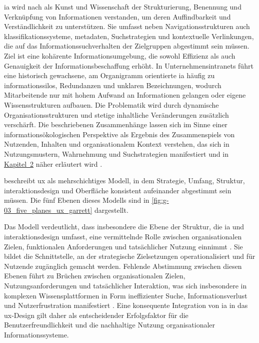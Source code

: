 \Gls{ia} wird nach \citeauthor{303:Rosenfeld2015} als Kunst und Wissenschaft der Strukturierung, Benennung und Verknüpfung von Informationen verstanden, um deren Auffindbarkeit und Verständlichkeit zu unterstützen. Sie umfasst neben Navigationsstrukturen auch \Gls{klassifikationssysteme}, \Gls{metadaten}, Suchstrategien und kontextuelle Verlinkungen, die auf das Informationssuchverhalten der Zielgruppen abgestimmt sein müssen. Ziel ist eine kohärente Informationsumgebung, die sowohl Effizienz als auch Genauigkeit der Informationsbeschaffung erhöht. In Unternehmensintranets führt eine historisch gewachsene, am Organigramm orientierte \Gls{ia} häufig zu \Gls{informationssilos}, Redundanzen und unklaren Bezeichnungen, wodurch Mitarbeitende nur mit hohem Aufwand an Informationen gelangen oder eigene Wissensstrukturen aufbauen. Die Problematik wird durch dynamische Organisationsstrukturen und stetige inhaltliche Veränderungen zusätzlich verschärft. Die beschriebenen Zusammenhänge lassen sich im Sinne einer informationsökologischen Perspektive als Ergebnis des Zusammenspiels von Nutzenden, Inhalten und organisationalem Kontext verstehen, das sich in Nutzungsmustern, Wahrnehmung und Suchstrategien manifestiert und in \hyperref[ch:02_theoretical-foundations]{Kapitel~2} näher erläutert wird \cite{303:Rosenfeld2015}.

\citeauthor{401:Garrett2011} beschreibt \Gls{ux} als mehrschichtiges Modell, in dem Strategie, Umfang, Struktur, \Gls{interaktionsdesign} und Oberfläche konsistent aufeinander abgestimmt sein müssen. Die fünf Ebenen dieses Modells sind in \autoref{fig:g-03_five_planes_ux_garrett} dargestellt.


Das Modell verdeutlicht, dass insbesondere die Ebene der Struktur, die \Gls{ia} und \Gls{interaktionsdesign} umfasst, eine vermittelnde Rolle zwischen organisationalen Zielen, funktionalen Anforderungen und tatsächlicher Nutzung einnimmt \cite{401:Garrett2011}. Sie bildet die Schnittstelle, an der strategische Zielsetzungen operationalisiert und für Nutzende zugänglich gemacht werden. Fehlende Abstimmung zwischen diesen Ebenen führt zu Brüchen zwischen organisationalen Zielen, Nutzungsanforderungen und tatsächlicher Interaktion, was sich insbesondere in komplexen Wissensplattformen in Form ineffizienter Suche, Informationsverlust und Nutzerfrustration manifestiert \cite{401:Garrett2011,303:Rosenfeld2015}. Eine konsequente Integration von \Gls{ia} in das \Gls{ux}-Design gilt daher als entscheidender Erfolgsfaktor für die Benutzerfreundlichkeit und die nachhaltige Nutzung organisationaler Informationssysteme.

